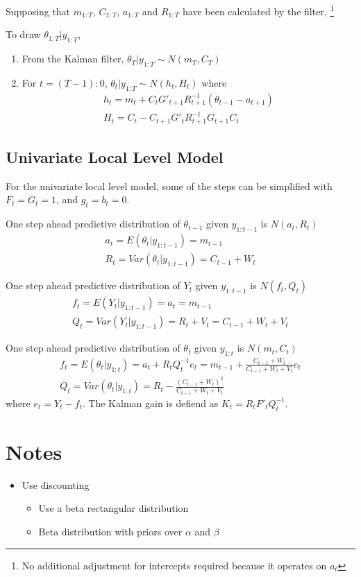 \documentclass{article}
\begin{document}
Supposing that $m_{1:T}$, $C_{1:T}$, $a_{1:T}$ and $R_{1:T}$ have been calculated by the filter,%
\footnote{No additional adjustment for intercepts required because it operates on $a_{t}$}

To draw $\theta_{1:T} | y_{1:T}$,

\begin{enumerate}
\item From the Kalman filter, $\theta_{T} | y_{1:T} \sim N(m_{T}, C_{T})$
\item For $t = (T-1):0$, $\theta_{t} | y_{1:T} \sim N(h_{t}, H_{t})$ where
  \begin{align*}
    h_{t} = m_{t} + C_{t} G'_{t + 1} R_{t+1}^{-1}(\theta_{t-1} - a_{t+1}) \\
    H_{t} = C_{t} - C_{t + 1} G'_{t} R_{t+1}^{-1} G_{t+1} C_{t}
  \end{align*}
\end{enumerate}

\subsection{Univariate Local Level Model}
\label{sec:local-level-model}

For the univariate local level model, some of the steps can be simplified with $F_{t} = G_{t} = 1$,
and $g_{t} = b_{t} = 0$.

One step ahead predictive distribution of $\theta_{t-1}$ given $y_{1:t-1}$ is $N(a_{t}, R_{t})$
\begin{align*}
  a_{t} = E(\theta_{t} | y_{1:t-1}) = m_{t-1} \\
  R_{t} = Var(\theta_{t} | y_{1:t-1}) = C_{t-1} + W_{t}
\end{align*}

One step ahead predictive distribution of $Y_{t}$ given $y_{1:t-1}$ is $N(f_{t}, Q_{t})$
\begin{align*}
  f_{t} = E(Y_{t} | y_{1:t-1}) = a_{t} = m_{t-1} \\
  Q_{t} = Var(Y_{t} | y_{1:t-1}) = R_{t} + V_{t} = C_{t-1} + W_{t} + V_{t}
\end{align*}

One step ahead predictive distribution of $\theta_{t}$ given $y_{1:t}$ is $N(m_{t}, C_{t})$
\begin{align*}
  f_{t} = E(\theta_{t} | y_{1:t}) = a_{t} + R_{t} Q_{t}^{-1} e_{t} = m_{t-1} + \frac{C_{t-1} + W_{t}}{C_{t-1} + W_{t} + V_{t}} e_{t} \\
  Q_{t} = Var(\theta_{t} | y_{1:t}) = R_{t} - \frac{(C_{t-1} + W_{t})^{2}}{C_{t-1} + W_{t} + V_{t}}
\end{align*}
where $e_{t} = Y_{t} - f_{t}$. The Kalman gain is defiend as $K_{t} = R_{t} F'_{t} Q_{t}^{-1}$.

\section{Notes}

\begin{itemize}
\item Use discounting
  \begin{itemize}
  \item Use a beta rectangular distribution
  \item Beta distribution with priors over $\alpha$  and $\beta$
  \end{itemize}
\end{itemize}
\end{document}
